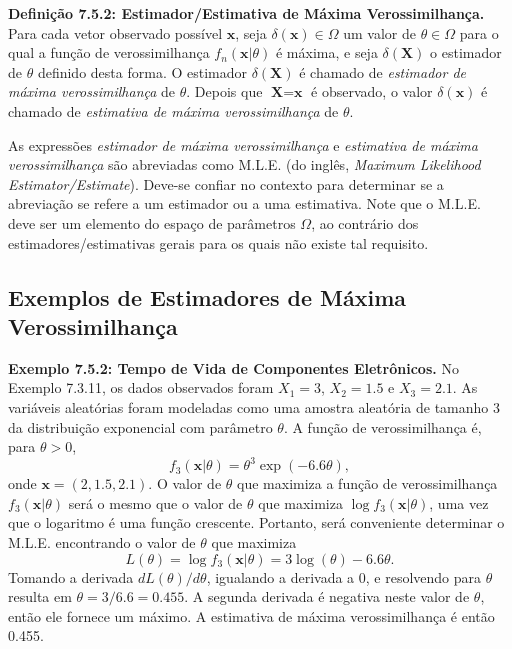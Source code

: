 \vspace{\baselineskip}

\textbf{Definição 7.5.2: Estimador/Estimativa de Máxima Verossimilhança.} Para cada vetor observado possível $\textbf{x}$, seja $\delta(\textbf{x}) \in \Omega$ um valor de $\theta \in \Omega$ para o qual a função de verossimilhança $f_n(\textbf{x}|\theta)$ é máxima, e seja $\delta(\textbf{X})$ o estimador de $\theta$ definido desta forma. O estimador $\delta(\textbf{X})$ é chamado de \textit{estimador de máxima verossimilhança} de $\theta$. Depois que $\textbf{X} = \textbf{x}$ é observado, o valor $\delta(\textbf{x})$ é chamado de \textit{estimativa de máxima verossimilhança} de $\theta$.

\vspace{\baselineskip}

As expressões \textit{estimador de máxima verossimilhança} e \textit{estimativa de máxima verossimilhança} são abreviadas como M.L.E. (do inglês, \textit{Maximum Likelihood Estimator/Estimate}). Deve-se confiar no contexto para determinar se a abreviação se refere a um estimador ou a uma estimativa. Note que o M.L.E. deve ser um elemento do espaço de parâmetros $\Omega$, ao contrário dos estimadores/estimativas gerais para os quais não existe tal requisito.

\subsection*{Exemplos de Estimadores de Máxima Verossimilhança}
\textbf{Exemplo 7.5.2: Tempo de Vida de Componentes Eletrônicos.} No Exemplo 7.3.11, os dados observados foram $X_1 = 3$, $X_2 = 1.5$ e $X_3 = 2.1$. As variáveis aleatórias foram modeladas como uma amostra aleatória de tamanho 3 da distribuição exponencial com parâmetro $\theta$. A função de verossimilhança é, para $\theta > 0$,
$$f_3(\textbf{x}|\theta) = \theta^3 \exp(-6.6\theta),$$
onde $\textbf{x} = (2, 1.5, 2.1)$. O valor de $\theta$ que maximiza a função de verossimilhança $f_3(\textbf{x}|\theta)$ será o mesmo que o valor de $\theta$ que maximiza $\log f_3(\textbf{x}|\theta)$, uma vez que o logaritmo é uma função crescente. Portanto, será conveniente determinar o M.L.E. encontrando o valor de $\theta$ que maximiza
$$L(\theta) = \log f_3(\textbf{x}|\theta) = 3 \log(\theta) - 6.6\theta.$$
Tomando a derivada $dL(\theta)/d\theta$, igualando a derivada a 0, e resolvendo para $\theta$ resulta em $\theta = 3/6.6 = 0.455$. A segunda derivada é negativa neste valor de $\theta$, então ele fornece um máximo. A estimativa de máxima verossimilhança é então 0.455.

